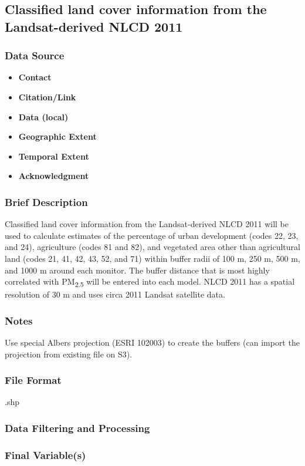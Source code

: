 \subsection{Classified land cover information from the Landsat-derived NLCD 2011}
\subsubsection*{Data Source}
\begin{itemize}[nolistsep]
\item \textbf{Contact}
\item \textbf{Citation/Link}
\item \textbf{Data (local)}
\item \textbf{Geographic Extent}
\item \textbf{Temporal Extent}
\item \textbf{Acknowledgment}
\end{itemize}
\subsubsection*{Brief Description}

Classified land cover information from the Landsat-derived NLCD 2011 
\citep{Homer2017} will be used to calculate estimates of the percentage of urban development (codes 22, 23, and 24), agriculture (codes 81 and 82), and vegetated area other than agricultural land (codes 21, 41, 42, 43, 52, and 71) within buffer radii of 100 m, 250 m, 500 m, and 1000 m around each monitor. The buffer distance that is most highly correlated with PM\textsubscript{2.5} will be entered into each model. NLCD 2011 has a spatial resolution of 30 m and uses circa 2011 Landsat satellite data. 

\subsubsection*{Notes}
Use special Albers projection (ESRI 102003) to create the buffers (can import the projection from existing file on S3).
\subsubsection*{File Format} .shp
\subsubsection*{Data Filtering and Processing}
\subsubsection*{Final Variable(s)}
